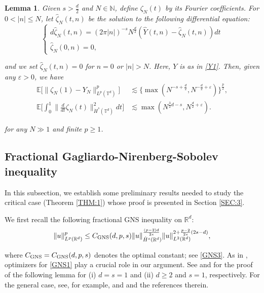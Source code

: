 \documentclass[letterpaper, 11pt,  reqno]{amsart}
\newtheorem{lemma}[theorem]{Lemma}
\newcommand{\noi}{\noindent}
\newcommand{\R}{\mathbb{R}}
\newcommand{\eps}{\varepsilon}
\newcommand{\ft}{\widehat}
\newcommand{\N}{\mathbb{N}}
\numberwithin{equation}{section}
\numberwithin{theorem}{section}
\newcommand{\ze}{\zeta}
\newcommand{\GNS}{\textup{GNS}}
\begin{document}
\begin{lemma}
\label{LEM:Z} 
Given $s > \frac{d}{2}$ and  $N \in \N$, 
define $\ze_N (t)$ by its Fourier coefficients. 
For  $0< | n | \leq N$,  
let 
$\ft \ze_N (t, n)$ be the solution to the following differential equation{\rm{:}}
\[ 
\begin{cases}
d \ft \ze_N (t, n) = (2\pi | n |)^{- s} N^{\frac{d}{2}}
(\ft Y (t, n) - \ft \ze_N (t, n)) d t\\
\ft \ze_N (0, n)  = 0,
\end{cases} 
\]
	
	
\noi
and we set $\ft \ze_N (t, n) = 0$ for $n = 0$ or $| n | > N$. 
Here, $Y$ is as in \eqref{Y1}.
Then, given any $\eps > 0$, 
 we have 
\begin{align*}
 \mathbb{E} \Big[\| \ze_N (1) - Y_N \|^p_{L^p (\mathbb{T}^d)}\Big] 
 & \lesssim 
\big\{\max
(N^{- s + \frac{d}{2}}, N^{- \frac{d}{2} +\eps})\big\}^{\frac{p}{2}}, \\
 \mathbb{E} \bigg[ \int_0^1 \Big\|  \frac{d}{dt} \ze_N (t) \Big\|_{\dot H^s (\mathbb{T}^d)}^2 dt \bigg] 
& \lesssim \max
(N^{\frac{3 }{2}d - s}, N^{\frac{d}{2} +\eps }).
\end{align*}


\noi
for any $N \gg 1$ and  finite $ p \geq 1$.


\end{lemma}







\subsection{Fractional Gagliardo-Nirenberg-Sobolev inequality}


In this subsection, we establish some preliminary results
needed to study the critical case (Theorem \ref{THM:1})
whose proof is presented in Section \ref{SEC:3}.


We first recall the 
following fractional GNS inequality on $\mathbb{R}^d$:
\begin{align}
\|u\|^p_{L^{p}(\R^d)}\le C_{\GNS}(d,p,s)	\| u \|^{\frac{(p - 2) d}{2s}}_{\dot{H}^s (\mathbb{R}^d)} \| u \|_{L^2 (\mathbb{R}^d)}^{2 + \frac{p-2}{2 s} (2 s - d)},
\label{GNS1}
\end{align}


\noi
where
$C_{\GNS} = C_{\GNS}(d,p,s)$ denotes the optimal constant;
see \eqref{GNS3}.
As in \cite{LRS, OST1, LW22}, optimizers for \eqref{GNS1}
play a crucial role in our argument.
See
\cite{Nagy} 
and 
\cite{Weinstein}
for the proof of the following lemma
for (i) $d = s = 1$ and 
(ii)  $d\ge 2$ and $s=1$, respectively.
For the general case, see, for example, 
 \cite[Proposition 3.1]{Frank} and \cite[Theorem 2.1]{BFV14} and the references therein.
 
\end{document}
